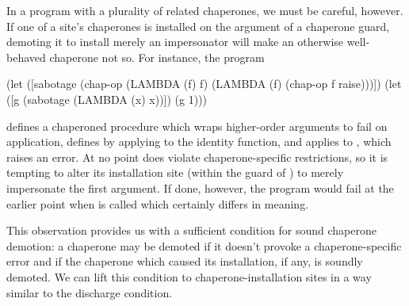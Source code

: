 In a program with a plurality of related chaperones, we must be careful, however.
If one of a site's chaperones is installed on the argument of a chaperone guard, demoting it to install merely an impersonator will make an otherwise well-behaved chaperone not so.
For instance, the program
\begin{schemedisplay}
(let ([sabotage (chap-op (LAMBDA (f) f) (LAMBDA (f) (chap-op f raise)))])
  (let ([g (sabotage (LAMBDA (x) x))])
    (g 1)))
\end{schemedisplay}
defines a chaperoned procedure  which wraps higher-order arguments to fail on application, defines  by applying  to the identity function, and applies  to , which raises an error.
At no point does  violate chaperone-specific restrictions, so it is tempting to alter its installation site (within the guard of ) to merely impersonate the first argument.
If done, however, the program would fail at the earlier point when  is called which certainly differs in meaning.

This observation provides us with a sufficient condition for sound chaperone demotion: a chaperone may be demoted if it doesn't provoke a chaperone-specific error and if the chaperone which caused its installation, if any, is soundly demoted.
We can lift this condition to chaperone-installation sites in a way similar to the discharge condition.

